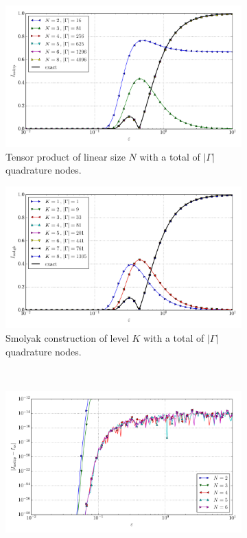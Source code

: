 \documentclass[a4paper,10pt]{article}
\begin{document}
\begin{figure}[ht!]
  \begin{subfigure}[t]{0.5\linewidth}
    \includegraphics[width=\linewidth]{./plots/tp_sg_4d_conv_eps_(3,0,0,0)_(3,0,0,0)_val_nsd_tp.pdf}
    \caption{Tensor product of linear size $N$ with a total of $|\Gamma|$ quadrature nodes.}
    \label{fig:tp_sg_4d_conv_eps_3000_3000_val_nsd_tp}
  \end{subfigure}
  \begin{subfigure}[t]{0.5\linewidth}
    \includegraphics[width=\linewidth]{./plots/tp_sg_4d_conv_eps_(3,0,0,0)_(3,0,0,0)_val_nsd_gk.pdf}
    \caption{Smolyak construction of level $K$ with a total of $|\Gamma|$ quadrature nodes.}
    \label{fig:tp_sg_4d_conv_eps_3000_3000_val_nsd_gk}
  \end{subfigure} \\
  \begin{subfigure}[t]{0.5\linewidth}
    \includegraphics[width=\linewidth]{./plots/tp_sg_4d_conv_eps_(3,0,0,0)_(3,0,0,0)_err_nsd_tp.pdf}

\end{subfigure}
\end{figure}
\end{document}
